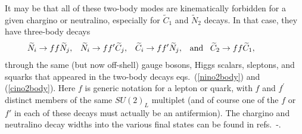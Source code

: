 \documentclass[12pt]{article}
\def\beq{\begin{eqnarray}}
\def\eeq{\end{eqnarray}}
\def\stilde{\widetilde}
\begin{document}
It may be that all of these two-body modes are kinematically forbidden for
a given chargino or neutralino, especially for $\stilde C_1$ and $\stilde
N_2$ decays. In that case, they have three-body decays
\beq
\stilde N_i \rightarrow f f \stilde N_j,\>\>\>\,
\stilde N_i \rightarrow f f^\prime \stilde C_j,\>\>\>\,
\stilde C_i \rightarrow f f^\prime \stilde N_j,\>\>\>\,{\rm and}\>\>\>\,
\stilde C_2 \rightarrow f f \stilde C_1,\qquad\>\>\>\>\>{}
\label{cino3body}
\eeq
through the same (but now off-shell) gauge bosons, Higgs scalars,
sleptons, and squarks that appeared in the two-body decays
eqs.~(\ref{nino2body}) and (\ref{cino2body}). Here $f$ is generic notation
for a lepton or quark, with $f$ and $f^\prime$ distinct members of the same
$SU(2)_L$ multiplet (and of course one of the $f$ or $f'$ in each of these
decays must actually be an antifermion).  The chargino and neutralino
decay widths into the various final states can be found in
refs.~\cite{inodecays}-\cite{neutralinoloopdecays}. 
\end{document}
